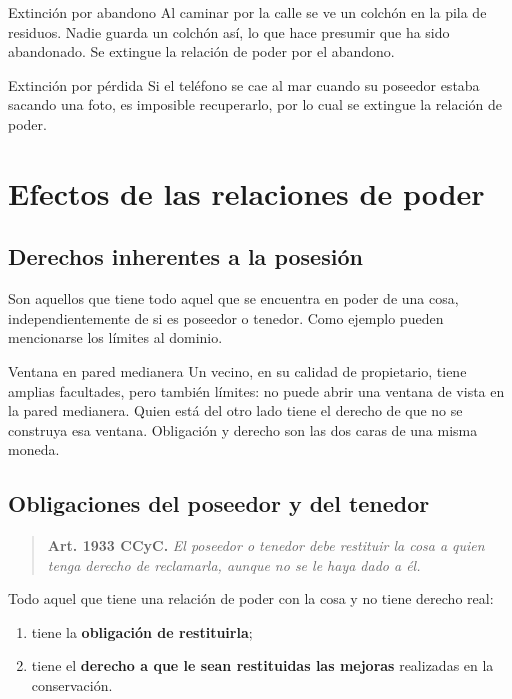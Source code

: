 \documentclass[12pt,oneside]{book}
\begin{document}
\begin{example}{Extinción por abandono}
Al caminar por la calle se ve un colchón en la pila de residuos. Nadie guarda un colchón así, lo que hace presumir que ha sido abandonado. Se extingue la relación de poder por el abandono.
\end{example}

\begin{example}{Extinción por pérdida}
Si el teléfono se cae al mar cuando su poseedor estaba sacando una foto, es imposible recuperarlo, por lo cual se extingue la relación de poder.
\end{example}

\section{Efectos de las relaciones de poder}

\subsection{Derechos inherentes a la posesión}

Son aquellos que tiene todo aquel que se encuentra en poder de una cosa, independientemente de si es poseedor o tenedor. Como ejemplo pueden mencionarse los límites al dominio.

\begin{example}{Ventana en pared medianera}
Un vecino, en su calidad de propietario, tiene amplias facultades, pero también límites: no puede abrir una ventana de vista en la pared medianera. Quien está del otro lado tiene el derecho de que no se construya esa ventana. Obligación y derecho son las dos caras de una misma moneda.
\end{example}

\subsection{Obligaciones del poseedor y del tenedor}

\begin{quote}
\textbf{Art. 1933 CCyC.} \textit{El poseedor o tenedor debe restituir la cosa a quien tenga derecho de reclamarla, aunque no se le haya dado a él.}
\end{quote}

Todo aquel que tiene una relación de poder con la cosa y no tiene derecho real:

\begin{enumerate}
    \item tiene la \textbf{obligación de restituirla};
    \item tiene el \textbf{derecho a que le sean restituidas las mejoras} realizadas en la conservación.
\end{enumerate}
\end{document}
